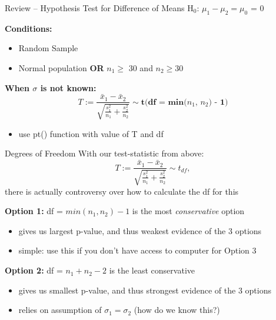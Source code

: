 \documentclass{beamer}
\begin{document}
\begin{frame}{Review -- Hypothesis Test for Difference of Means}
H$_0$: $\mu_1 - \mu_2 = \mu_0$ = 0 \vspace{3mm}

\textbf{Conditions:}
\begin{itemize}
    \item Random Sample
    \item Normal population \textbf{OR} $n_1 \geq$ 30 and $n_2 \geq 30$
\end{itemize} \vspace{3mm}


\textbf{When $\sigma$ is not known:}
\begin{equation*}
    T := \frac{\bar{x}_1-\bar{x}_2}{\sqrt{\frac{s_1^2}{n_1}+\frac{s_2^2}{n_2}}} \sim \textbf{t(df = min($n_1$, $n_2$) - 1)}
\end{equation*} \vspace{-4mm}
\begin{itemize}
    \item use pt() function with value of T and df
\end{itemize}
\end{frame}

\begin{frame}{Degrees of Freedom}
With our test-statistic from above:
\begin{equation*}
    T := \frac{\bar{x}_1-\bar{x}_2}{\sqrt{\frac{s_1^2}{n_1}+\frac{s_2^2}{n_2}}} \sim t_{df},
\end{equation*}
there is actually controversy over how to calculate the df for this \vspace{8mm}

\textbf{Option 1:} df = $min(n_1, n_2)-1$ is the most \textit{conservative} option
\begin{itemize}
    \item gives us largest p-value, and thus weakest evidence of the 3 options
    \item simple: use this if you don't have access to computer for Option 3
\end{itemize} \vspace{6mm}

\textbf{Option 2:} df = $n_1 + n_2 - 2$ is the least conservative
\begin{itemize}
    \item gives us smallest p-value, and thus strongest evidence of the 3 options
    \item relies on assumption of $\sigma_1 = \sigma_2$ (how do we know this?)
\end{itemize}
\end{frame}
\end{document}
